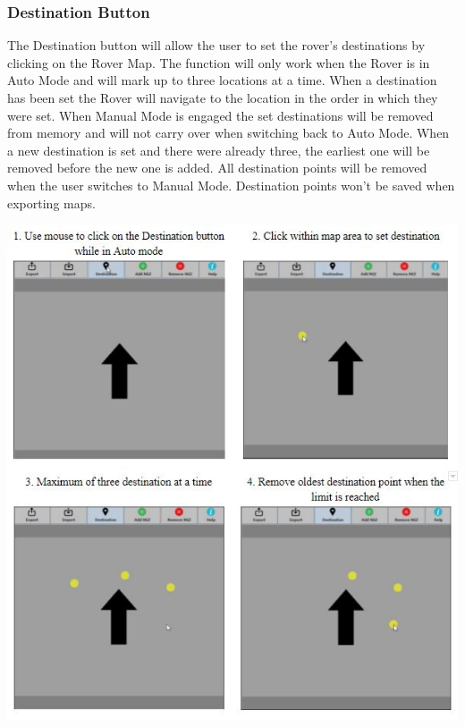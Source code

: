 \documentclass[12pt]{article}
\begin{document}
	\subsubsection{Destination Button}
The Destination button will allow the user to set the rover’s destinations by clicking on the Rover Map. The function will only work when the Rover is in Auto Mode and will mark up to three locations at a time. When a destination has been set the Rover will navigate to the location in the order in which they were set. When Manual Mode is engaged the set destinations will be removed from memory and will not carry over when switching back to Auto Mode. When a new destination is set and there were already three, the earliest one will be removed before the new one is added. All destination points will be removed when the user switches to Manual Mode. Destination points  won’t be saved when exporting maps.	
		\begin{center}
		\includegraphics[scale=1.1]{Destination.jpg}
		\end{center}
	
\end{document}
